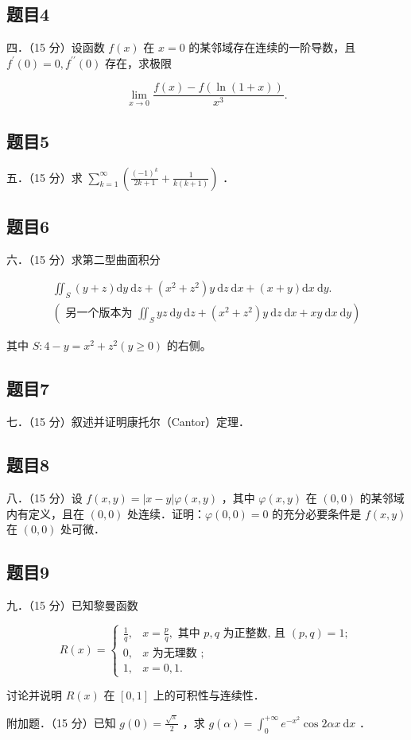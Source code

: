 \documentclass{article}
\begin{document}
\subsection{题目4}
四．（15 分）设函数 \(f(x)\) 在 \(x=0\) 的某邻域存在连续的一阶导数，且 \(f^{\prime}(0)=0, f^{\prime \prime}(0)\) 存在，求极限

\[
\lim _{x \rightarrow 0} \frac{f(x)-f(\ln (1+x))}{x^{3}} .
\]

\subsection{题目5}
五．（15 分）求 \(\sum_{k=1}^{\infty}\left(\frac{(-1)^{k}}{2 k+1}+\frac{1}{k(k+1)}\right)\) ．

\subsection{题目6}
六．（15 分）求第二型曲面积分

\[
\begin{gathered}
\iint_{S}(y+z) \mathrm{d} y \mathrm{~d} z+\left(x^{2}+z^{2}\right) y \mathrm{~d} z \mathrm{~d} x+(x+y) \mathrm{d} x \mathrm{~d} y . \\
\left(\text { 另一个版本为 } \iint_{S} y z \mathrm{~d} y \mathrm{~d} z+\left(x^{2}+z^{2}\right) y \mathrm{~d} z \mathrm{~d} x+x y \mathrm{~d} x \mathrm{~d} y\right)
\end{gathered}
\]

其中 \(S: 4-y=x^{2}+z^{2}(y \geq 0)\) 的右侧。

\subsection{题目7}
七．（15 分）叙述并证明康托尔（Cantor）定理．

\subsection{题目8}
八．（15 分）设 \(f(x, y)=|x-y| \varphi(x, y)\) ，其中 \(\varphi(x, y)\) 在 \((0,0)\) 的某邻域内有定义，且在 \((0,0)\) 处连续．证明：\(\varphi(0,0)=0\) 的充分必要条件是 \(f(x, y)\) 在 \((0,0)\) 处可微．

\subsection{题目9}
九．（15 分）已知黎曼函数

\[
R(x)= \begin{cases}\frac{1}{q}, & x=\frac{p}{q}, \text { 其中 } p, q \text { 为正整数, 且 }(p, q)=1 ; \\ 0, & x \text { 为无理数 } ; \\ 1, & x=0,1 .\end{cases}
\]

讨论并说明 \(R(x)\) 在 \([0,1]\) 上的可积性与连续性．

附加题．（15 分）已知 \(g(0)=\frac{\sqrt{\pi}}{2}\) ，求 \(g(\alpha)=\int_{0}^{+\infty} e^{-x^{2}} \cos 2 \alpha x \mathrm{~d} x\) ．
\end{document}
